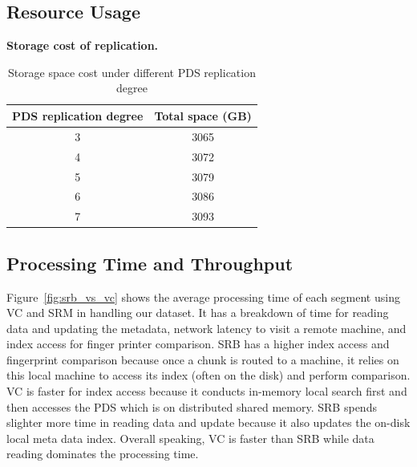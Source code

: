 \subsection{Resource Usage}
{\bf Storage cost of replication.}
\begin{table}
    \begin{tabular}{|c|c|}
    \hline
    PDS replication degree & Total space (GB) \\ \hline
    3                      & 3065             \\ \hline
    4                      & 3072             \\ \hline
    5                      & 3079             \\ \hline
    6                      & 3086             \\ \hline
    7                      & 3093             \\ \hline
    \end{tabular}
\caption{Storage space cost under different PDS replication degree}
\label{tab:replcation_cost}
\end{table}

\subsection{Processing Time and Throughput}

Figure~\ref{fig:srb_vs_vc} shows
the  average  processing  time of  each segment using VC and SRM in handling our dataset.
It has a breakdown of time for reading data and updating the metadata, network latency to visit
a remote machine, and index access for finger printer comparison.
SRB has a higher index access and fingerprint comparison because once a chunk is routed to a machine,
it relies on this local machine to access its index (often on the disk) and perform comparison.
VC is faster for index access because it conducts in-memory local search first and then
accesses  the PDS which is on distributed shared memory.  
SRB spends  slighter more time in  reading data and update because it also updates the on-disk
local meta data index.
Overall speaking,  VC is faster than SRB while data reading dominates the processing time. 

